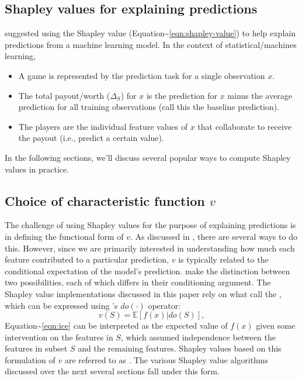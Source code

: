\subsection{Shapley values for explaining predictions}

\citet{strumbelj-2014-explaining} suggested using the Shapley value
(Equation\textasciitilde{}\eqref{eqn:shapley-value}) to help explain
predictions from a machine learning model. In the context of
statistical/machines learning,

\begin{itemize}

  \item A game is represented by the prediction task for a single observation $x$.
  
  \item The total payout/worth ($\Delta_S$) for $x$ is the prediction for $x$ minus the average prediction for all training observations (call this the baseline prediction).
  
  \item The players are the individual feature values of $x$ that collaborate to receive the payout (i.e., predict a certain value).
  
\end{itemize}

In the following sections, we'll discuss several popular ways to compute
Shapley values in practice.

\subsection{Choice of characteristic function $v$}

The challenge of using Shapley values for the purpose of explaining
predictions is in defining the functional form of \(v\). As discussed in
\citet{chen-2020-true}, there are several ways to do this. However,
since we are primarily interested in understanding how much each feature
contributed to a particular prediction, \(v\) is typically related to
the conditional expectation of the model's prediction.
\citet{chen-2020-true} make the distinction between two possibilities,
each of which differs in their conditioning argument. The Shapley value
implementations discussed in this paper rely on what
\citet{chen-2020-true} call the
, which can be expressed
using \citet{pearl-2009-causality}'s \(do\left(\cdot\right)\) operator:
\begin{equation}
\label{eqn:ice}
  v\left(S\right) = \mathbb{E}\left[f\left(x\right) | do\left(S\right)\right],
\end{equation} Equation\textasciitilde{}\ref{eqn:ice} can be interpreted
as the expected value of \(f\left(x\right)\) given some intervention on
the features in \(S\), which assumed independence between the features
in subset \(S\) and the remaining features. Shapley values based on this
formulation of \(v\) are referred to as
 \citep{chen-2020-true}. The various
Shapley value algorithms discussed over the next several sections fall
under this form.

